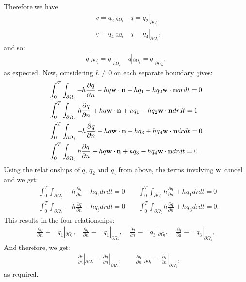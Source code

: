 	Therefore we have 
	\begin{align*}
		&q = q_2 |_{\partial \Omega_l} \quad q =  q_2 |_{\partial \Omega_r}\\
		&q = q_4 |_{\partial \Omega_t} \quad q =  q_4 |_{\partial \Omega_b},
	\end{align*}
	and so:
	\begin{align*}
		q |_{\partial \Omega_l} = q |_{\partial \Omega_r} \quad q |_{\partial \Omega_t} = q|_{\partial \Omega_b},
	\end{align*}
	as expected.
	Now, considering $h \neq 0$ on each separate boundary gives:
	\begin{align*}
		&\int_0^T \int_{\partial \Omega_l} - h \frac{\partial q}{\partial n}  - h q \mathbf{w} \cdot \mathbf{n} - h q_1 + h q_2 \mathbf{w} \cdot \mathbf{n} dr dt = 0\\
		&\int_0^T \int_{\partial \Omega_r}  h \frac{\partial q}{\partial n}  + h q \mathbf{w} \cdot \mathbf{n} + h q_1 - h q_2 \mathbf{w} \cdot \mathbf{n} dr dt = 0 \\
		&\int_0^T \int_{\partial \Omega_t}- h \frac{\partial q}{\partial n}  - h q \mathbf{w} \cdot \mathbf{n} - h q_3 + h q_4 \mathbf{w} \cdot \mathbf{n} dr dt = 0 \\
		&\int_0^T \int_{\partial \Omega_b} h \frac{\partial q}{\partial n}  + h q \mathbf{w} \cdot \mathbf{n} + h q_3 - h q_4 \mathbf{w} \cdot \mathbf{n} dr dt = 0 .
	\end{align*}
	Using the relationships of $q$, $q_2$ and $q_4$ from above, the terms involving $\mathbf{w}$ cancel and we get:
	\begin{align*}
		&\int_0^T \int_{\partial \Omega_l} - h \frac{\partial q}{\partial n}   - h q_1 dr dt = 0 \qquad \int_0^T \int_{\partial \Omega_r}  h \frac{\partial q}{\partial n}  + h q_1 dr dt = 0 \\
		&\int_0^T \int_{\partial \Omega_t}- h \frac{\partial q}{\partial n}   - h q_3 dr dt = 0 \qquad
		\int_0^T \int_{\partial \Omega_b} h \frac{\partial q}{\partial n}   + h q_3  dr dt = 0 .
	\end{align*}
	This results in the four relationships:
	\begin{align*}
		\frac{\partial q}{\partial n} = - q_1 |_{\partial \Omega_l}, \quad \frac{\partial q}{\partial n} = - q_1 |_{\partial \Omega_r}, \quad
		\frac{\partial q}{\partial n} = - q_3 |_{\partial \Omega_t}, \quad
		\frac{\partial q}{\partial n} = - q_3 |_{\partial \Omega_b},
	\end{align*}
	And therefore, we get:
	\begin{align*}
		&\frac{\partial q}{\partial n}|_{\partial \Omega_l} = \frac{\partial q}{\partial n}|_{\partial \Omega_r}, \qquad \frac{\partial q}{\partial n}|_{\partial \Omega_t} = \frac{\partial q}{\partial n}|_{\partial \Omega_b},
	\end{align*}
	as required.
	
